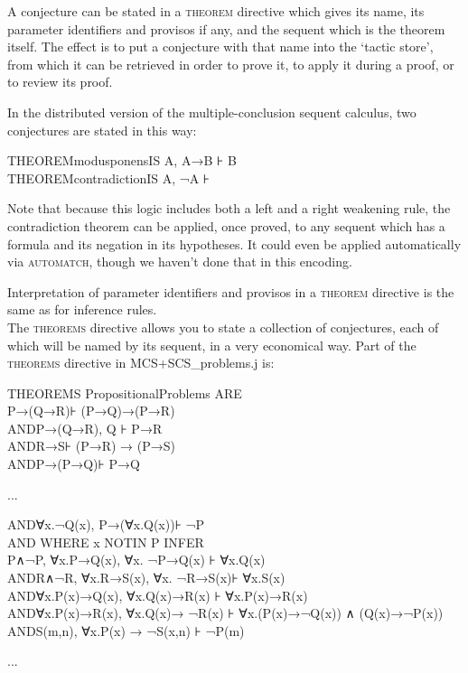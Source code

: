 \documentclass[11pt]{book}
\newcommand{\tab}{\hspace{5mm}}
\begin{document}
A conjecture can be stated in a \textsc{theorem} directive which gives 
its name, its parameter identifiers and provisos if any, and 
the sequent which is the theorem itself. The effect is to put 
a conjecture with that name into the `tactic store', from which 
it can be retrieved in order to prove it, to apply it during 
a proof, or to review its proof.


In the distributed version of the multiple-conclusion sequent 
calculus, two conjectures are stated in this way:

THEOREM\tab modusponens\tab IS A, A→B ⊦ B\\
THEOREM\tab contradiction\tab IS A, ¬A ⊦


Note that because this logic includes both a left and a right 
weakening rule, the contradiction theorem can be applied, once 
proved, to any sequent which has a formula and its negation in 
its hypotheses. It could even be applied automatically via \textsc{automatch}, 
though we haven't done that in this encoding.


Interpretation of parameter identifiers and provisos in a \textsc{theorem} 
directive is the same as for inference rules.\\
The \textsc{theorems} directive allows you to state a collection of 
conjectures, each of which will be named by its sequent, in a 
very economical way. Part of the \textsc{theorems} directive in MCS+SCS\_problems.j 
is:

THEOREMS PropositionalProblems ARE\\
\tab P→(Q→R)\tab ⊦ (P→Q)→(P→R)\\
AND\tab P→(Q→R), Q \tab ⊦ P→R\\
AND\tab R→S\tab ⊦ (P→R) → (P→S)\\
AND\tab P→(P→Q)\tab ⊦ P→Q

\tab ...

\tab AND\tab ∀x.¬Q(x), P→(∀x.Q(x))\tab ⊦ ¬P\\
AND WHERE x NOTIN P INFER \\
\tab P∧¬P, ∀x.P→Q(x), ∀x. ¬P→Q(x) \tab ⊦ ∀x.Q(x)\\
AND\tab R∧¬R, ∀x.R→S(x), ∀x. ¬R→S(x)\tab ⊦ 
∀x.S(x)\\
AND\tab ∀x.P(x)→Q(x), ∀x.Q(x)→R(x) \tab ⊦ ∀x.P(x)→R(x)\\
AND\tab ∀x.P(x)→R(x), ∀x.Q(x)→ ¬R(x) \tab ⊦ ∀x.(P(x)→¬Q(x)) 
∧ (Q(x)→¬P(x))\\
AND\tab S(m,n), ∀x.P(x) → ¬S(x,n) \tab ⊦ ¬P(m)

\tab ...
\end{document}
